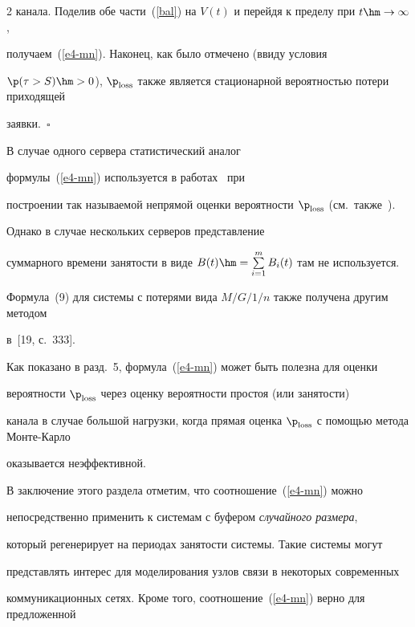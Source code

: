 \begin{multicols}{2}
канала. Поделив обе части~(\ref{bal}) на $V(t)$ и перейдя к пределу при $t\hm\to\infty$, 


получаем~(\ref{e4-mn}). Наконец, как было отмечено (ввиду  условия


$\p(\tau>S)\hm>0$),  $\p_{\mathrm{loss}}$ также  является стационарной вероятностью потери приходящей 


заявки.~\hfill$\square$





\smallskip





В случае одного сервера  статистический аналог


формулы~(\ref{e4-mn}) используется   в работах~\cite{Whitt91, Whitt90} при


построении так называемой непрямой оценки вероятности $\p_{\mathrm{loss}}$ (см.\ также~\cite{GM}). 


Однако в случае нескольких серверов представление


 суммарного времени занятости в виде $B(t)\hm=\sum\limits_{i=1}^mB_i(t)$ там не используется.


 Формула~(9) для системы с потерями вида $M/G/1/n$ так\-же получена другим методом 


 в~[19, с.~333].





 Как показано  в разд.~5,  формула~(\ref{e4-mn})  может быть полезна для  оценки


 вероятности $\p_{\mathrm{loss}}$ через оценку вероятности простоя (или занятости)


 канала в случае большой нагрузки, когда прямая оценка $\p_{\mathrm{loss}}$ с помощью метода Мон\-те-Кар\-ло


оказывается неэффективной.





В заключение этого раздела отметим, что  соотношение~(\ref{e4-mn}) можно


непосредственно применить к системам с буфером {\it случайного размера},


который  регенерирует на периодах занятости сис\-те\-мы. Такие сис\-те\-мы могут


представлять интерес для моделирования  узлов связи в некоторых современных


коммуникационных сетях. Кроме того, соотношение~(\ref{e4-mn}) верно  для предложенной 



\end{multicols}
